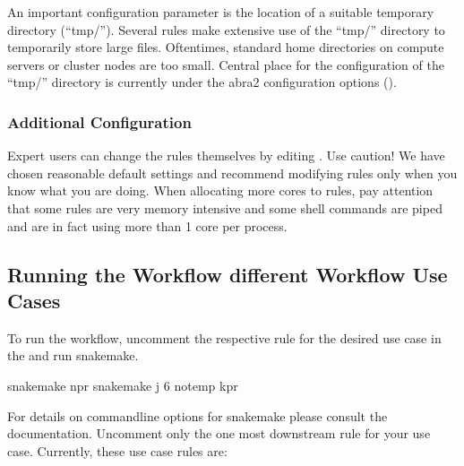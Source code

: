 \documentclass[letterpaper,10pt,english]{sphinxhowto}
\begin{document}
An important configuration parameter is the location of a suitable temporary directory (“tmp/”). Several rules make extensive use of the “tmp/” directory to temporarily store large files. Oftentimes, standard home directories on compute servers or cluster nodes are too small. Central place for the configuration of the “tmp/” directory is currently under the abra2 configuration options ().


\subsubsection{Additional Configuration}
\label{\detokenize{index:additional-configuration}}
Expert users can change the rules themselves by editing . Use caution! We have chosen reasonable default settings and recommend modifying rules only when you know what you are doing. When allocating more cores to rules, pay attention that some rules are very memory intensive and some shell commands are piped and are in fact using more than 1 core per process.


\subsection{Running the Workflow \sphinxhyphen{} different Workflow Use Cases}
\label{\detokenize{index:running-the-workflow-different-workflow-use-cases}}
To run the workflow, un\sphinxhyphen{}comment the respective rule for the desired use case in the  and run snakemake.

\begin{sphinxVerbatim}[commandchars=\\\{\}]
\PYGZdl{} snakemake \textendash{}npr
\PYGZdl{} snakemake \textendash{}j 6 \PYGZhy{}\PYGZhy{}notemp \PYGZhy{}kpr
\end{sphinxVerbatim}

For details on commandline options for snakemake please consult the  documentation. Un\sphinxhyphen{}comment only the one most downstream rule for your use case. Currently, these use case rules are:

\begin{sphinxVerbatim}[commandchars=\\\{\}]
\end{sphinxVerbatim}
\end{document}
